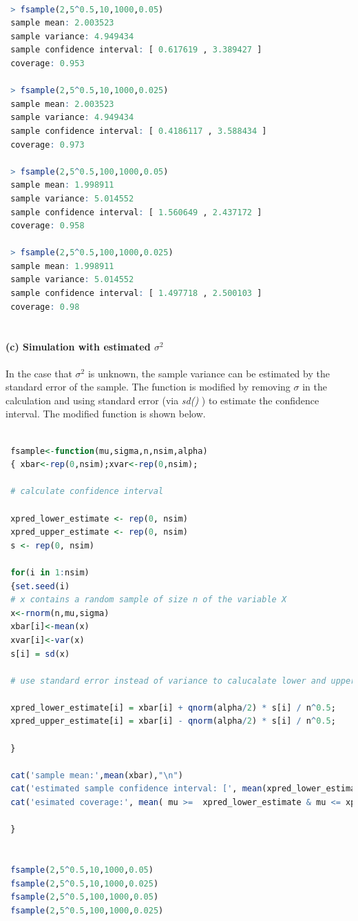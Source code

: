 \documentclass[10pt, letterpaper]{proc}
\begin{document}
 \begin{lstlisting}[language=R, breaklines=T, basicstyle=\footnotesize\ttfamily]
 
 > fsample(2,5^0.5,10,1000,0.05)
 sample mean: 2.003523 
 sample variance: 4.949434 
 sample confidence interval: [ 0.617619 , 3.389427 ] 
 coverage: 0.953 
 
 > fsample(2,5^0.5,10,1000,0.025)
 sample mean: 2.003523 
 sample variance: 4.949434 
 sample confidence interval: [ 0.4186117 , 3.588434 ] 
 coverage: 0.973 
 
 > fsample(2,5^0.5,100,1000,0.05)
 sample mean: 1.998911 
 sample variance: 5.014552 
 sample confidence interval: [ 1.560649 , 2.437172 ] 
 coverage: 0.958 
 
 > fsample(2,5^0.5,100,1000,0.025)
 sample mean: 1.998911 
 sample variance: 5.014552 
 sample confidence interval: [ 1.497718 , 2.500103 ] 
 coverage: 0.98 
 
 \end{lstlisting}
 
 \paragraph{(c) Simulation with estimated $\sigma^2 $} In the case that $\sigma^2$ is unknown, the sample variance can be estimated by the standard error of the sample. The function is modified by removing $\sigma$ in the calculation and using standard error (via  \textit{sd()} ) to estimate the confidence interval. The modified function is shown below.
 
 \begin{lstlisting}[language=R, breaklines=T, basicstyle=\footnotesize\ttfamily]
 
 fsample<-function(mu,sigma,n,nsim,alpha)
 { xbar<-rep(0,nsim);xvar<-rep(0,nsim); 
 
 # calculate confidence interval
 
 xpred_lower_estimate <- rep(0, nsim)
 xpred_upper_estimate <- rep(0, nsim)
 s <- rep(0, nsim)
 
 for(i in 1:nsim)
 {set.seed(i)
 # x contains a random sample of size n of the variable X
 x<-rnorm(n,mu,sigma)
 xbar[i]<-mean(x)
 xvar[i]<-var(x)
 s[i] = sd(x)
 
 # use standard error instead of variance to calucalate lower and upper bound
 
 xpred_lower_estimate[i] = xbar[i] + qnorm(alpha/2) * s[i] / n^0.5;
 xpred_upper_estimate[i] = xbar[i] - qnorm(alpha/2) * s[i] / n^0.5;
 
 }
 
 cat('sample mean:',mean(xbar),"\n")
 cat('estimated sample confidence interval: [', mean(xpred_lower_estimate), ",", mean(xpred_upper_estimate), "] \n")
 cat('esimated coverage:', mean( mu >=  xpred_lower_estimate & mu <= xpred_upper_estimate) )

 }
 

 fsample(2,5^0.5,10,1000,0.05)
 fsample(2,5^0.5,10,1000,0.025)
 fsample(2,5^0.5,100,1000,0.05)
 fsample(2,5^0.5,100,1000,0.025)
 
 
 \end{lstlisting}
 
\end{document}

